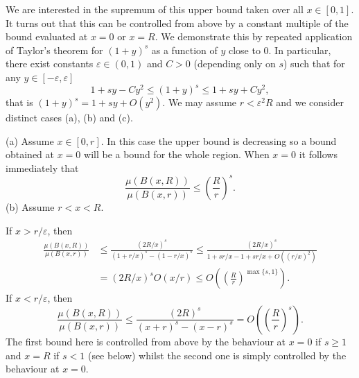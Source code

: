 We are interested in the supremum of this upper bound taken over all $x \in [0,1]$.  It turns out that this can be controlled from above by a constant  multiple of the bound evaluated at $x=0$ or $x=R$.  We demonstrate this by repeated application of Taylor's theorem for   $(1+y)^s$ as a function of $y$ close to 0. In particular,   there exist constants $\varepsilon \in (0,1)$ and $C > 0$ (depending only on $s$) such that for any $y \in [-\varepsilon, \varepsilon]$
\[
1 + s y - C y^2 \le (1+y)^s \le 1 + s y + C y^2,
\]
that is $ (1+y)^s = 1 + s y +O( y^2)$.  We may assume $r<\varepsilon^2 R$ and we consider distinct cases (a), (b) and (c).



\noindent (a) Assume $x\in [0,r]$.  In this case the upper bound is decreasing so a bound obtained at $x = 0$ will be a bound for the whole region. When $x=0$ it follows immediately that
\[
\frac{\mu(B(x,R))}{\mu(B(x,r))} \le \left(\frac{R}{r}\right)^s.
\]
\noindent (b) Assume $r < x < R$. 

If  $x > r/\varepsilon$, then 
\begin{align*}
\frac{\mu(B(x,R))}{\mu(B(x,r))} &\le \frac{(2R/x)^s}{(1+r/x)^s - (1-r/x)^s} \le \frac{(2R/x)^s}{1+sr/x-1+sr/x + O((r/x)^2)}\\ 
&=  (2R/x)^s O(x/r) \le O\left(\left(\frac{R}{r}\right)^{\max\{s,1\}}\right).    
\end{align*}
If $x < r/\varepsilon$, then 
\[
\frac{\mu(B(x,R))}{\mu(B(x,r))} \le \frac{(2R)^s}{(x+r)^s - (x-r)^s} = O\left(\left(\frac{R}{r}\right)^s\right).
\]
The first bound here is controlled from above by the behaviour at  $x=0$ if $s \geq 1$ and $x=R$ if $s <1$ (see below) whilst the second one is simply controlled by the behaviour at $x=0$. 


